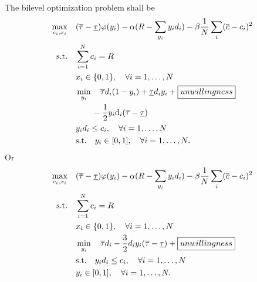 \documentclass[a4paper]{article}
\begin{document}
The bilevel optimization problem shall be  
\begin{subequations}
  \begin{align}
    \max_{c_{i}, x_{i}} \quad & (\overline{\tau} - \underline{\tau}) \varphi(y_{i}) - \alpha ( R - \sum_{y_{i}} y_{i} d_{i} ) - \beta \frac{1}{N} \sum_{i} (\overline{c} - c_{i})^2 \\
    \mathrm{s.t.} \quad & \sum_{i=1}^{N} c_{i} = R \\
    & x_{i} \in \{ 0,1 \}, \quad \forall i= 1, \ldots, N \\
    & \min_{y_{i}} \quad \overline{\tau} d_{i} (1 - y_{i}) + \underline{\tau} d_{i} y_{i} + \boxed{unwillingness} \\
    & \qquad - \frac{1}{2} y_{i} \text{d}_{i} (\overline{\tau} - \underline{\tau}) \notag \\
    & y_{i} d_{i} \le c_{i}, \quad \forall i= 1, \ldots, N \\
    & \mathrm{s.t.} \quad y_{i} \in [0,1], \quad \forall i= 1, \ldots, N.
  \end{align}
\end{subequations}
Or
\begin{subequations}
  \begin{align}
    \max_{c_{i},x_{i}} \quad & (\overline{\tau} - \underline{\tau}) \varphi(y_{i}) - \alpha ( R - \sum_{y_{i}} y_{i} d_{i} ) - \beta \frac{1}{N} \sum_{i} (\overline{c} - c_{i})^2 \\
    \mathrm{s.t.} \quad & \sum_{i=1}^{N} c_{i} = R \\
    & x_{i} \in \{ 0,1 \}, \quad \forall i= 1, \ldots, N \\
    & \min_{y_{i}} \quad \overline{\tau} d_{i} - \frac{3}{2} d_{i} y_{i} ( \overline{\tau} - \underline{\tau} ) + \boxed{unwillingness}\\
    & \mathrm{s.t.} \quad y_{i} d_{i} \le c_{i}, \quad \forall i= 1, \ldots, N \\
    & y_{i} \in [0,1], \quad \forall i= 1, \ldots, N.
  \end{align}
\end{subequations}
\end{document}
